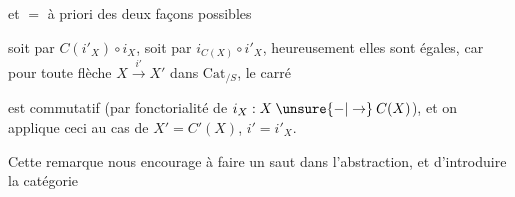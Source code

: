 
et $=$ à priori des deux façons possibles


soit par $C(i'_X)\circ i_X$, soit par $i_{C(X)}\circ i'_X$, heureusement elles sont égales, car pour toute flèche $X\xrightarrow{i'}X'$ dans $\mathrm{Cat}_{/S}$, le carré


est commutatif (par fonctorialité de $i_X:X\mathbin{\unsure{-|\to}}C(X)$), et on applique ceci au cas de $X'=C'(X)$, $i'=i'_X$. 

Cette remarque nous encourage à faire un saut dans l'abstraction, et d'introduire la catégorie
